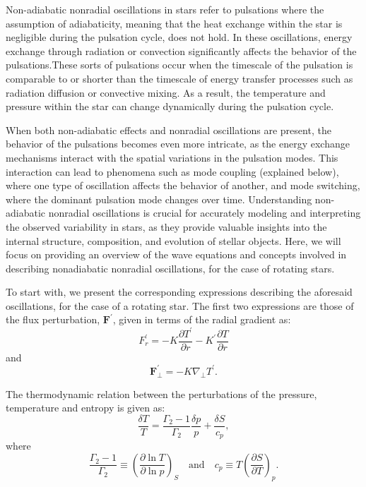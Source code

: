 \documentclass{article}
\begin{document}
Non-adiabatic nonradial oscillations in stars refer to pulsations where the assumption of adiabaticity, meaning that the heat exchange within the star is negligible during the pulsation cycle, does not hold. In these oscillations, energy exchange through radiation or convection significantly affects the behavior of the pulsations.These sorts of pulsations occur when the timescale of the pulsation is comparable to or shorter than the timescale of energy transfer processes such as radiation diffusion or convective mixing. As a result, the temperature and pressure within the star can change dynamically during the pulsation cycle.

When both non-adiabatic effects and nonradial oscillations are present, the behavior of the pulsations becomes even more intricate, as the energy exchange mechanisms interact with the spatial variations in the pulsation modes. This interaction can lead to phenomena such as mode coupling (explained below), where one type of oscillation affects the behavior of another, and mode switching, where the dominant pulsation mode changes over time. Understanding non-adiabatic nonradial oscillations is crucial for accurately modeling and interpreting the observed variability in stars, as they provide valuable insights into the internal structure, composition, and evolution of stellar objects. Here, we will focus on providing an overview of the wave equations and concepts involved in describing nonadiabatic nonradial oscillations, for the case of rotating stars.

To start with, we present the corresponding expressions describing the aforesaid oscillations, for the case of a rotating star. The first two expressions are those of the flux perturbation, $\textbf{F}^{'}$, given in terms of the radial gradient as\cite{unno1989nonradial}:
\begin{equation}
    F^{'}_{r} = - K\frac{\partial T^{'}}{\partial r} - K^{'}\frac{\partial T}{\partial r}
\end{equation}
and 
\begin{equation}
    \mathbf{F}^{'}_{\perp} = - K\nabla_{\perp}T^{'}.
\end{equation}

The thermodynamic relation between the perturbations of the pressure, temperature and entropy is given as\cite{hansen2004stellar, unno1989nonradial}:
\begin{equation}
    \frac{\delta T}{T} = \frac{\Gamma_{2}-1}{\Gamma_{2}}\frac{\delta p}{p} + \frac{\delta S}{c_{p}},
\end{equation}
where 
\begin{equation}
\frac{\Gamma_{2}-1}{\Gamma_{2}} \equiv \left( \frac{\partial \ln T}{\partial \ln p} \right)_{S} \quad \text{and} \quad c_{p} \equiv T \left( \frac{\partial S}{\partial T} \right)_{p}.
\end{equation}
\end{document}

